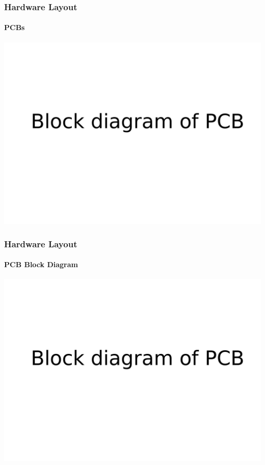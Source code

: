 \documentclass{beamer}
\begin{document}
\begin{frame}
\frametitle{Hardware Layout}
\framesubtitle{PCBs}
    \begin{center}
      \includegraphics[width=.90\textwidth]{Images/Hardware_block}
    \end{center}
\end{frame}

\begin{frame}
\frametitle{Hardware Layout}
\framesubtitle{PCB Block Diagram}
    \begin{center}
      \includegraphics[width=.90\textwidth]{Images/Hardware_block}
    \end{center}
\end{frame}
\end{document}
